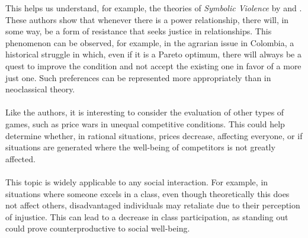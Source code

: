 \documentclass[11pt]{article}
\begin{document}
\begin{flushleft}
    This helps us understand, for example, the theories of \textit{Symbolic Violence} by \citet{Foulcault_1987} and \citet{Bourdieu_2018}. These authors show that whenever there is a power relationship, there will, in some way, be a form of resistance that seeks justice in relationships. This phenomenon can be observed, for example, in the agrarian issue in Colombia, a historical struggle in which, even if it is a Pareto optimum, there will always be a quest to improve the condition and not accept the existing one in favor of a more just one. Such preferences can be represented more appropriately than in neoclassical theory.\\~\\
    
    Like the authors, it is interesting to consider the evaluation of other types of games, such as price wars in unequal competitive conditions. This could help determine whether, in rational situations, prices decrease, affecting everyone, or if situations are generated where the well-being of competitors is not greatly affected.\\~\\
    
    This topic is widely applicable to any social interaction. For example, in situations where someone excels in a class, even though theoretically this does not affect others, disadvantaged individuals may retaliate due to their perception of injustice. This can lead to a decrease in class participation, as standing out could prove counterproductive to social well-being.
\end{flushleft}

\newpage
\medskip

\newpage
\nocite{*}

\end{document}
